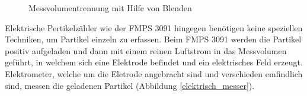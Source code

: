\begin{figure}[H]
	\myfloatalign
	 \quad
	\caption[Messvolumentrennung mit Hilfe von Blenden\cite{reinraum}]
	{Messvolumentrennung mit Hilfe von Blenden\cite{reinraum}}
\end{figure}

Elektrische Pertikelz\"{a}hler wie der FMPS 3091 hingegen ben\"{o}tigen keine speziellen Techniken, um Partikel einzeln zu erfassen. Beim FMPS 3091 werden die Partikel positiv aufgeladen und dann mit einem reinen Luftstrom in das Messvolumen gef\"{u}hrt, in welchem sich eine Elektrode befindet und ein elektrisches Feld erzeugt. Elektrometer, welche um die Eletrode angebracht sind und verschieden emfindlich sind, messen die geladenen Partikel (Abbildung \ref{elektrisch_messer}).

